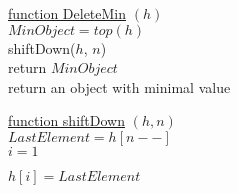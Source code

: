 \documentclass{article}
\begin{document}
\begin{algorithm}
    

    \underline{function DeleteMin} $(h)$\\
        $MinObject = top(h)$\\
        shiftDown($h$, $n$)\\
        return $MinObject$\\
    \caption{return an object with minimal value}
    
    \BlankLine
    \BlankLine
    
    \underline{function shiftDown} $(h, n)$\\
    $LastElement = h[n--]$\\
    $i = 1$\\
    

   $h[i] = LastElement$\\
\end{algorithm}
\end{document}
